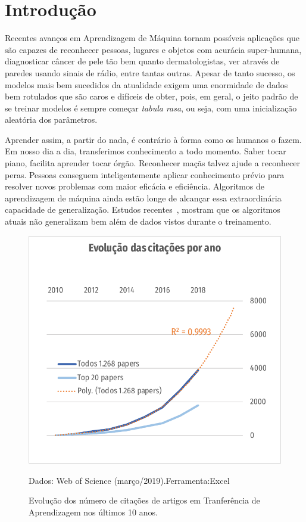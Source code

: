 \documentclass[sigconf]{acmart}
\newcommand{\source}[2]{\raggedleft{}\vspace*{-7mm}\caption*{ \textmd{\scriptsize{Dados: {#1}.\hfill Ferramenta:{#2}}}}}
\begin{document}
\section{Introdução} 
  Recentes avanços em Aprendizagem de Máquina tornam possíveis aplicações que são capazes de reconhecer pessoas, lugares e objetos com acurácia super-humana\cite{fei}, diagnosticar câncer de pele tão bem quanto dermatologistas\cite{skin_cancer},  ver através de paredes usando sinais de rádio\cite{wifi}, entre tantas outras. Apesar de tanto sucesso, os modelos mais bem sucedidos da atualidade exigem uma enormidade de dados bem rotulados que são caros e difíceis de obter, pois, em geral, o jeito padrão de se treinar modelos é sempre começar \emph{tabula rasa}, ou seja, com uma inicialização aleatória dos parâmetros. 
  
  Aprender assim, a partir do nada, é contrário à forma como os humanos o fazem. Em nosso dia a dia, transferimos conhecimento a todo momento. Saber tocar piano, facilita aprender tocar órgão. Reconhecer maçãs talvez ajude a reconhecer peras. Pessoas conseguem inteligentemente aplicar conhecimento prévio para resolver novos problemas com maior eficácia e eficiência\cite{PanYang}. Algoritmos de aprendizagem de máquina ainda estão longe de alcançar essa extraordinária capacidade de generalização\cite{goodfellow}. Estudos recentes~\cite{DBLP:journals/corr/JiaL17}, mostram que os algoritmos atuais não generalizam bem além de dados vistos durante o treinamento.
  \begin{figure}[h]
    \includegraphics[width=\columnwidth]{citacoes_por_ano2.pdf}
    \source{Web of Science (março/2019)}{Excel}
    \caption{Evolução dos número de citações de artigos em Tranferência de Aprendizagem nos últimos 10 anos.}
    \label{fig:citacoes_por_ano}
  \end{figure}
  
\end{document}
